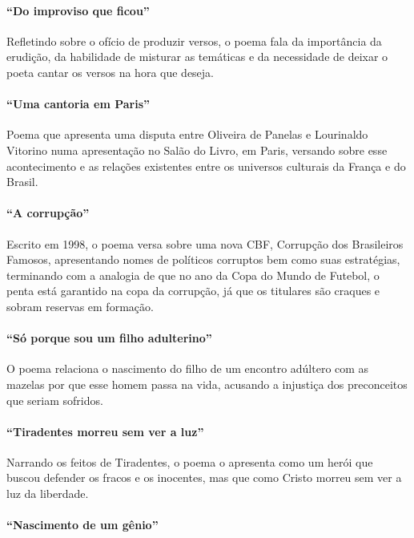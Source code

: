 \paragraph{``Do improviso que ficou''}

Refletindo sobre o ofício de produzir versos, o poema fala da
importância da erudição, da habilidade de misturar as temáticas e da
necessidade de deixar o poeta cantar os versos na hora que deseja.

\paragraph{``Uma cantoria em Paris''}

Poema que apresenta uma disputa entre Oliveira de Panelas e Lourinaldo Vitorino numa
apresentação no Salão do Livro, em Paris, versando sobre esse
acontecimento e as relações existentes entre os universos culturais da
França e do Brasil.

\paragraph{``A corrupção''}

Escrito em 1998, o poema versa sobre uma nova CBF, Corrupção dos
Brasileiros Famosos, apresentando nomes de políticos corruptos bem como
suas estratégias, terminando com a analogia de que no ano da Copa do
Mundo de Futebol, o penta está garantido na copa da corrupção, já que
os titulares são craques e sobram reservas em formação.

\paragraph{``Só porque sou um filho adulterino''}

O poema relaciona o nascimento do filho de um encontro adúltero com as
mazelas por que esse homem passa na vida, acusando a injustiça dos preconceitos
que seriam sofridos.

\paragraph{``Tiradentes morreu sem ver a luz''}

Narrando os feitos de Tiradentes, o poema o apresenta como um herói que
buscou defender os fracos e os inocentes, mas que como Cristo morreu
sem ver a luz da liberdade.

\paragraph{``Nascimento de um gênio''}

